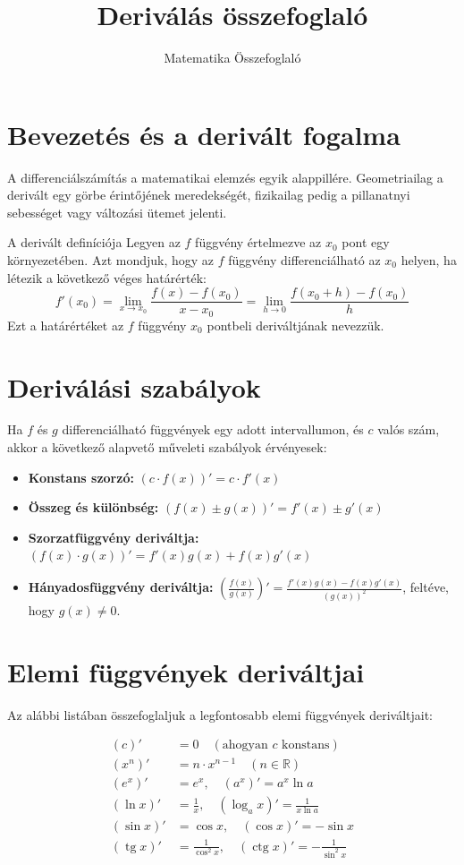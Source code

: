 \documentclass[11pt,a4paper]{article}
\title{Deriválás összefoglaló}
\author{Matematika Összefoglaló}
\date{}
\begin{document}
\maketitle

\section{Bevezetés és a derivált fogalma}
A differenciálszámítás a matematikai elemzés egyik alappillére. Geometriailag a derivált egy görbe érintőjének meredekségét, fizikailag pedig a pillanatnyi sebességet vagy változási ütemet jelenti.

\begin{defbox}{A derivált definíciója}
Legyen az $f$ függvény értelmezve az $x_0$ pont egy környezetében. Azt mondjuk, hogy az $f$ függvény differenciálható az $x_0$ helyen, ha létezik a következő véges határérték:
\[
f'(x_0) = \lim_{x \to x_0} \frac{f(x) - f(x_0)}{x - x_0} = \lim_{h \to 0} \frac{f(x_0 + h) - f(x_0)}{h}
\]
Ezt a határértéket az $f$ függvény $x_0$ pontbeli deriváltjának nevezzük.
\end{defbox}

\section{Deriválási szabályok}
Ha $f$ és $g$ differenciálható függvények egy adott intervallumon, és $c$ valós szám, akkor a következő alapvető műveleti szabályok érvényesek:

\begin{itemize}
    \item \textbf{Konstans szorzó:} $(c \cdot f(x))' = c \cdot f'(x)$
    \item \textbf{Összeg és különbség:} $(f(x) \pm g(x))' = f'(x) \pm g'(x)$
    \item \textbf{Szorzatfüggvény deriváltja:} $(f(x) \cdot g(x))' = f'(x)g(x) + f(x)g'(x)$
    \item \textbf{Hányadosfüggvény deriváltja:} $\left(\frac{f(x)}{g(x)}\right)' = \frac{f'(x)g(x) - f(x)g'(x)}{(g(x))^2}$, feltéve, hogy $g(x) \neq 0$.
\end{itemize}

\section{Elemi függvények deriváltjai}
Az alábbi listában összefoglaljuk a legfontosabb elemi függvények deriváltjait:

\begin{align*}
    (c)' &= 0 \quad (\text{ahogyan } c \text{ konstans}) \\
    (x^n)' &= n \cdot x^{n-1} \quad (n \in \mathbb{R}) \\
    (e^x)' &= e^x, \quad (a^x)' = a^x \ln a \\
    (\ln x)' &= \frac{1}{x}, \quad (\log_a x)' = \frac{1}{x \ln a} \\
    (\sin x)' &= \cos x, \quad (\cos x)' = -\sin x \\
    (\operatorname{tg} x)' &= \frac{1}{\cos^2 x}, \quad (\operatorname{ctg} x)' = -\frac{1}{\sin^2 x}
\end{align*}
\end{document}
